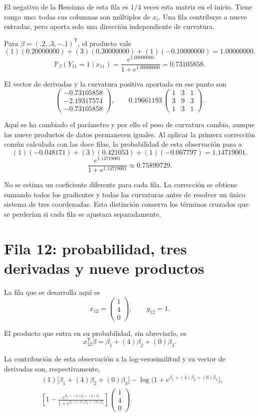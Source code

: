\documentclass[11pt,a4paper]{article}
\newcommand{\Prob}{\mathbb P}
\newcommand{\T}{^{\mathsf T}}
\begin{document}
El negativo de la Hessiana de esta fila es \(1/4\)
veces esta matriz en el inicio. Tiene rango uno:
todas sus columnas son múltiplos de \(x_i\).
Una fila contribuye a nueve entradas, pero aporta
solo una dirección independiente de curvatura.

Para \(\beta=(.2,.3,-.1)\T\), el producto vale
\[
(1)(0.20000000)+(3)(0.30000000)+(1)(-0.10000000)=1.00000000.
\]
\[
\Prob_\beta(Y_{11}=1\mid x_{11})=\frac{e^{1.00000000}}{1+e^{1.00000000}}=0.73105858.
\]

El vector de derivadas y la curvatura positiva aportada
en ese punto son
\[
\begin{pmatrix}-0.73105858\\-2.19317574\\-0.73105858\end{pmatrix},\qquad 0.19661193\,\begin{pmatrix}1&3&1\\3&9&3\\1&3&1\end{pmatrix}.
\]

Aquí se ha cambiado el parámetro y por ello el peso de
curvatura cambia, aunque los nueve productos de datos
permanecen iguales.
Al aplicar la primera corrección común calculada con las doce filas,
la probabilidad de esta observación pasa a
\[
(1)(-0.048171)+(3)(0.421053)+(1)(-0.067797)=1.14719001.
\]
\[
\frac{e^{1.14719001}}{1+e^{1.14719001}}\approx0.75899729.
\]

No se estima un coeficiente diferente para cada fila.
La corrección se obtiene sumando todos los gradientes y todas
las curvaturas antes de resolver un único sistema de tres coordenadas.
Esta distinción conserva los términos cruzados que se perderían
si cada fila se ajustara separadamente.

\clearpage
\section{Fila 12: probabilidad, tres derivadas y nueve productos}\label{logit94}
La fila que se desarrolla aquí es
\[
x_{12}=\begin{pmatrix}1\\4\\0\end{pmatrix},\qquad y_{12}=1.
\]

El producto que entra en su probabilidad, sin abreviarlo, es
\[
x_{12}\T\beta=\beta_1+(4)\beta_2+(0)\beta_3.
\]

La contribución de esta observación a la log-verosimilitud
y su vector de derivadas son, respectivamente,
\[
\begin{aligned}
&(1)\bigl[\beta_1+(4)\beta_2+(0)\beta_3\bigr]-\log\bigl(1+e^{\beta_1+(4)\beta_2+(0)\beta_3}\bigr),\\&\left[1-\frac{e^{\beta_1+(4)\beta_2+(0)\beta_3}}{1+e^{\beta_1+(4)\beta_2+(0)\beta_3}}\right]\begin{pmatrix}1\\4\\0\end{pmatrix}.\end{aligned}
\]
\end{document}
